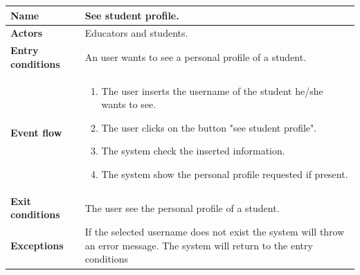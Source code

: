 \begin{enumerate}[label=\textbf{UC.\arabic*}]
        \begin{table}[H]
    	    \centering
                \renewcommand{\arraystretch}{1.5}
                \begin{tabular}{|m{3.2cm}|m{9.8cm}|}
                    \hline
                    \textbf{Name} & See student profile. \\
                    \hline
                    \textbf{Actors} & Educators and students. \\
                    \hline
                    \textbf{Entry conditions}  & An user wants to see a personal profile of a student. \\
                    \hline
                    \textbf{Event flow}  & 
                    \begin{enumerate}[label=\arabic*.]
                        \item The user inserts the username of the student he/she wants to see.
                        \item The user clicks on the button "see student profile".
                        \item The system check the inserted information.
                        \item The system show the personal profile requested if present.
                    \end{enumerate}\\ 
                    \hline
                    \textbf{Exit conditions}  & The user see the personal profile of a student. \\
                    \hline
                    \textbf{Exceptions} & If the selected username does not exist the system will throw an error message. The system will return to the entry conditions \\
                    \hline
                \end{tabular}
        \end{table}
    \end{enumerate}
    

